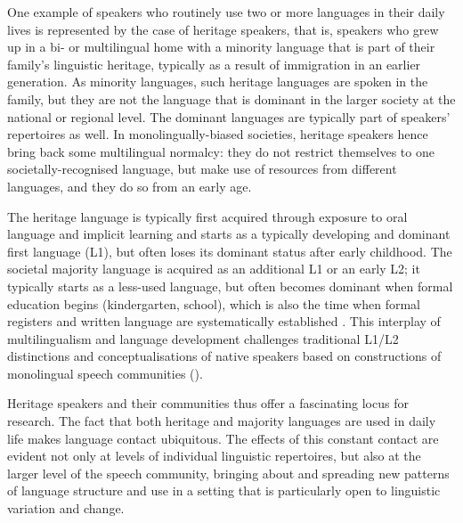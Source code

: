 \documentclass[output=paper,colorlinks,citecolor=brown]{langscibook}
\begin{document}
One example of speakers who routinely use two or more languages in their daily lives is represented by the case of heritage speakers, that is, speakers who grew up in a bi- or multilingual home with a minority language that is part of their family’s linguistic heritage, typically as a result of immigration in an earlier generation. As minority languages, such heritage languages are spoken in the family, but they are not the language that is dominant in the larger society at the national or regional level. The dominant languages are typically part of speakers’ repertoires as well. In monolingually\hyp biased societies, heritage speakers hence bring back some multilingual normalcy: they do not restrict themselves to one societally\hyp recognised language, but make use of resources from different languages, and they do so from an early age.

The heritage language is typically first acquired through exposure to oral language and implicit learning and starts as a typically developing and dominant first language (L1), but often loses its dominant status after early childhood. The societal majority language is acquired as an additional L1 or an early L2; it typically starts as a less\hyp used language, but often becomes dominant when formal education begins (kindergarten, school), which is also the time when formal registers and written language are systematically established \citep{Rothman2007}. This interplay of multilingualism and language development challenges traditional L1/L2 distinctions and conceptualisations of native speakers based on constructions of monolingual speech communities (\citealt{RothmanTreffers-Daller2014, WieseEtAl2022}).

Heritage speakers and their communities thus offer a fascinating locus for research. The fact that both heritage and majority languages are used in daily life makes language contact ubiquitous. The effects of this constant contact are evident not only at levels of individual linguistic repertoires, but also at the larger level of the speech community, bringing about and spreading new patterns of language structure and use in a setting that is particularly open to linguistic variation and change.
\end{document}
